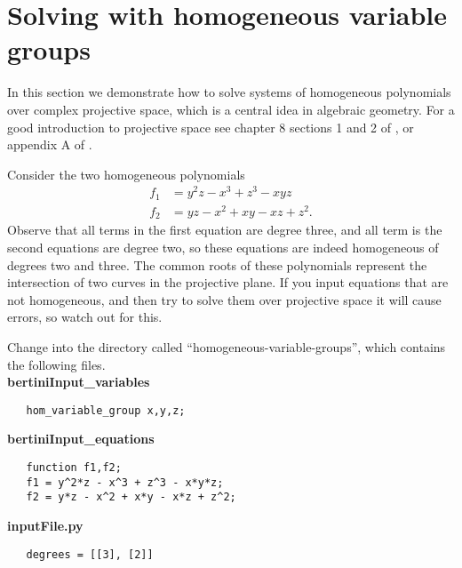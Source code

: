 \documentclass[12pt]{article}
\theoremstyle{definition}
\begin{document}
\section{Solving with homogeneous variable groups}
In this section we demonstrate how to solve systems of homogeneous 
polynomials over complex projective space, which is a central idea in 
algebraic geometry. For a good introduction to 
projective space see chapter 8 sections 1 and 2 of \cite{clo}, or 
appendix A of \cite{st}.

Consider the two homogeneous polynomials
\begin{align*}
   f_1 &= y^2z - x^3 + z^3 - xyz \\
   f_2 &= yz - x^2 + xy - xz + z^2. 
\end{align*}
Observe that all terms in the first equation are degree three, and all 
term is the second equations are degree two, so these equations are 
indeed homogeneous of degrees two and three. 
The common roots of these polynomials
represent
the intersection of two curves in the projective plane.
If you input equations that 
are not homogeneous, and then try to solve them over projective space it 
will cause errors, so watch out for this.

Change into the directory 
called ``homogeneous-variable-groups'', which contains the following 
files.\\

\noindent \textbf{bertiniInput\_variables}
\begin{leftbar}
\vspace{-10pt} 
\begin{verbatim}
   hom_variable_group x,y,z;
\end{verbatim}\vspace{-10pt} 
\end{leftbar}

\noindent \textbf{bertiniInput\_equations}
\begin{leftbar}
\vspace{-10pt} 
\begin{verbatim}
   function f1,f2;
   f1 = y^2*z - x^3 + z^3 - x*y*z;
   f2 = y*z - x^2 + x*y - x*z + z^2;
\end{verbatim}\vspace{-10pt} 
\end{leftbar}


\noindent \textbf{inputFile.py}
\begin{leftbar}
\vspace{-10pt} 
\begin{verbatim}
   degrees = [[3], [2]]
\end{verbatim}\vspace{-10pt} 
\end{leftbar}
\end{document}
